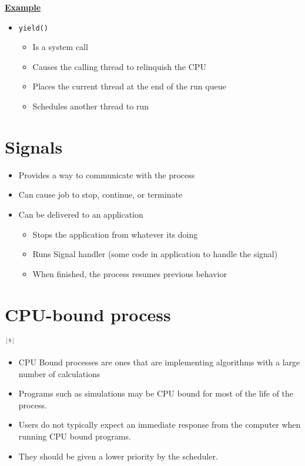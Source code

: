 \documentclass[12pt]{article}
\begin{document}
\underline{\textbf{Example}}

\begin{itemize}
    \item \texttt{yield()}
    \begin{itemize}
        \item Is a system call
        \item Causes the calling thread to relinquish the CPU
        \item Places the current thread at the end of the run queue
        \item Schedules another thread to run
    \end{itemize}
\end{itemize}

\section{Signals}

\begin{itemize}
    \item Provides a way to communicate with the process
    \item Can cause job to stop, continue, or terminate
    \item Can be delivered to an application

    \begin{itemize}
        \item Stops the application from whatever its doing
        \item Runs Signal handler (some code in application to handle the signal)
        \item When finished, the process resumes previous behavior
    \end{itemize}
\end{itemize}

\section{CPU-bound process} $^{[8]}$

\begin{itemize}
    \item CPU Bound processes are ones that are implementing algorithms
    with a large number of calculations
    \item Programs such as simulations may be CPU bound for most of the life of the process.
    \item Users do not typically expect an immediate response from the computer when running CPU bound programs.
    \item They should be given a lower priority by the scheduler.
\end{itemize}
\end{document}
